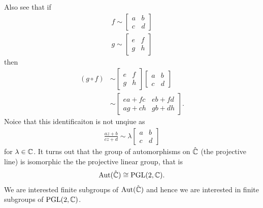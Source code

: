 \documentclass{unswmaths}
\begin{document}
Also see that if
\begin{align}
    f \sim \left[ \begin{array}{cc} a & b \\ c & d \end{array}\right] \\
    g \sim \left[ \begin{array}{cc} e & f \\ g & h \end{array}\right] 
\end{align}
then
\begin{align}
    (g \circ f) &\sim \left[ \begin{array}{cc} e & f \\ g & h \end{array}\right] \left[ \begin{array}{cc} a & b \\ c & d \end{array} \right] \\
    &\sim \left[ \begin{array}{cc} ea + fc & eb + fd \\ ag + ch & gb + dh\end{array}\right].
\end{align}
Noice that this identificaiton is not unqiue as
\begin{align}
    \frac{az + b}{cz+d} \sim \lambda\left[ \begin{array}{cc} a & b \\ c & d \end{array}\right]
\end{align}
for $ \lambda \in \mathbb{C} $.
It turns out that the group of automorphisms on $ \hat{\mathbb{C}} $ (the projective line) is isomorphic the the projective linear group, that is
\begin{align}
    \operatorname{Aut}(\hat{\mathbb{C}}) \cong \operatorname{PGL}(2,\mathbb{C}).
\end{align}
We are interested finite subgroups of $ \operatorname{Aut}(\hat{\mathbb{C}}) $ and hence we are interested in finite subgroups of $ \operatorname{PGL}(2, \mathbb{C}) $.
\end{document}
